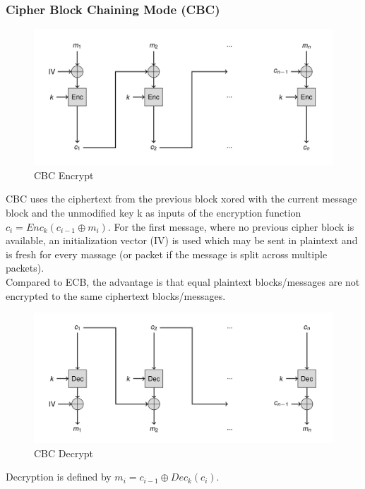 \subsubsection{Cipher Block Chaining Mode (CBC)}
\begin{figure}[H]
  \centering
  \includegraphics[width=.8\textwidth]{figures/cbc_encrypt.png}
  \caption{CBC Encrypt}
\end{figure}
CBC uses the ciphertext from the previous block xored with the current message block and the unmodified key k as inputs of the encryption function $c_i = Enc_k(c_{i-1} \oplus m_i)$.
For the first message, where no previous cipher block is available, an initialization vector (IV) is used which may be sent in plaintext and is fresh for every massage (or packet if the message is split across multiple packets).\\
Compared to ECB, the advantage is that equal plaintext blocks/messages are not encrypted to the same ciphertext blocks/messages.
\begin{figure}[H]
  \centering
  \includegraphics[width=.8\textwidth]{figures/cbc_decrypt.png}
  \caption{CBC Decrypt}
\end{figure}
Decryption is defined by $m_i = c_{i-1} \oplus Dec_k(c_i)$.

